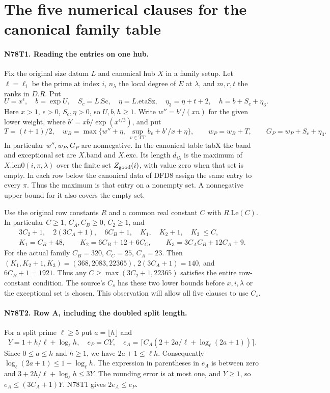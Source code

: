 \section{The five numerical clauses for the canonical family table}

\paragraph{N78T1. Reading the entries on one hub.}
Fix the original size datum $L$ and canonical hub $X$ in a family
setup. Let $\ell=\ell_i$ be the prime at index $i$, $n_\lambda$
the local degree of $E$ at $\lambda$, and $m,r,t$ the ranks in
$D.R$. Put
\[
 U=x^\epsilon,\quad b=\exp U,\quad S_c=L.\mathrm{Sc},\quad
 \eta=L.\mathrm{etaSz},\quad \eta_3=\eta+t+2,\quad h=b+S_c+\eta_3 .
\]
Here $x>1$, $\epsilon>0$, $S_c,\eta>0$, so $U,b,h\ge1$.
Write $w''=b'/(xn)$ for the given lower weight,
where $b'=xb/\exp(x^{\epsilon/3})$, and put
\[
 T=(t+1)/2,\quad
 w_B=\max\{w''+\eta,\ \sup_{v\in\mathrm{TT}}b_v+b'/x+\eta\},
 \qquad w_P=w_B+T,\qquad G_P=w_P+S_c+\eta_3 .
\]
In particular $w'',w_P,G_P$ are nonnegative. In the canonical
table $\mathrm{tabX}$ the band and exceptional set are $X.\mathrm{band}$
and $X.\mathrm{exc}$. Its length $d_{i\lambda}$ is the maximum of
$X.\mathrm{len0}(i,\pi,\lambda)$ over the finite set $Z_{\rm good}(i)$,
with value zero when that set is empty. In each row below the
canonical data of DFD8 assign the same entry to every $\pi$. Thus
the maximum is that entry on a nonempty set. A nonnegative upper
bound for it also covers the empty set.

Use the original row constants $R$ and a common real constant $C$
with $R.\mathrm{Le}(C)$. In particular $C\ge1$, $C_A,C_B\ge0$,
$C_2\ge1$, and
\[
 \begin{gathered}
 3C_2+1,\quad 2(3C_A+1),\quad 6C_B+1,\quad
 K_1,\quad K_2+1,\quad K_3\ \le C,\\
 K_1=C_B+48,\qquad K_2=6C_B+12+6C_C,\qquad
 K_3=3C_AC_B+12C_A+9 .
 \end{gathered}
\]
For the actual family $C_B=320$, $C_C=25$, $C_A=23$.
Then $(K_1,K_2+1,K_3)=(368,2083,22365)$, $2(3C_A+1)=140$,
and $6C_B+1=1921$. Thus any $C\ge\max(3C_2+1,22365)$ satisfies
the entire row-constant condition. The source's $C_s$ has these
two lower bounds before $x,i,\lambda$ or the exceptional set is
chosen. This observation will allow all five clauses to use $C_s$.

\paragraph{N78T2. Row A, including the doubled split length.}
For a split prime $\ell\ge5$ put $a=\lfloor h\rfloor$ and
\[
 Y=1+h/\ell+\log_\ell h,\quad e_P=CY,\quad
 e_A=\big\lceil C_A(2+2a/\ell+\log_\ell(2a+1))\big\rceil .
\]
Since $0\le a\le h$ and $h\ge1$, we have $2a+1\le \ell h$.
Consequently $\log_\ell(2a+1)\le1+\log_\ell h$. The expression
in parentheses in $e_A$ is between zero and
$3+2h/\ell+\log_\ell h\le3Y$. The rounding error is at most one,
and $Y\ge1$, so $e_A\le(3C_A+1)Y$. N78T1 gives $2e_A\le e_P$.

